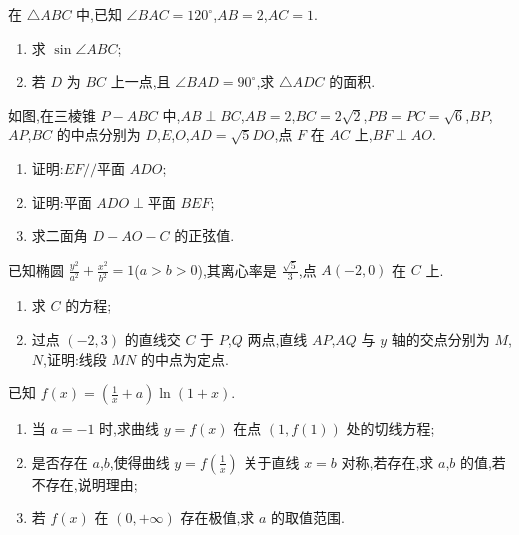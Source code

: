 \begin{problem}
在 \(\triangle ABC\) 中,已知 \(\angle BAC=120^\circ\),\(AB=2\),\(AC=1\).

\begin{enumerate}
\item 求 \(\sin \angle ABC\);
\item 若 \(D\) 为 \(BC\) 上一点,且 \(\angle BAD=90^\circ\),求 \(\triangle ADC\) 的面积.
\end{enumerate}
\end{problem}

\begin{problem}
如图,在三棱锥 \(P-ABC\) 中,\(AB\perp BC\),\(AB=2\),\(BC=2\sqrt2\),\(PB=PC=\sqrt6\),\(BP\),\(AP\),\(BC\) 的中点分别为 \(D\),\(E\),\(O\),\(AD=\sqrt5 DO\),点 \(F\) 在 \(AC\) 上,\(BF\perp AO\).



\begin{enumerate}
\item 证明:\(EF // \text{平面 }ADO\);
\item 证明:\(\text{平面 }ADO\perp\text{平面 }BEF\);
\item 求二面角 \(D-AO-C\) 的正弦值.
\end{enumerate}

\end{problem}

\begin{problem}
已知椭圆
\(\frac{y^2}{a^2}+\frac{x^2}{b^2}=1\)(\(a>b>0\)),其离心率是 \(\frac{\sqrt5}{3}\),点 \(A(-2,0)\) 在 \(C\) 上.

\begin{enumerate}
\item 求 \(C\) 的方程;
\item 过点 \((-2,3)\) 的直线交 \(C\) 于 \(P\),\(Q\) 两点,直线 \(AP\),\(AQ\) 与 \(y\) 轴的交点分别为 \(M\),\(N\),证明:线段 \(MN\) 的中点为定点.
\end{enumerate}
\end{problem}

\begin{problem}
已知
\(f(x)=\left( \frac1x+a \right)\ln(1+x)\).

\begin{enumerate}
\item 当 \(a=-1\) 时,求曲线 \(y=f(x)\) 在点 \((1,f(1))\) 处的切线方程;
\item 是否存在 \(a\),\(b\),使得曲线 \(y=f\left( \frac1x \right)\) 关于直线 \(x=b\) 对称,若存在,求 \(a\),\(b\) 的值,若不存在,说明理由;
\item 若 \(f(x)\) 在 \((0,+\infty)\) 存在极值,求 \(a\) 的取值范围.
\end{enumerate}
\end{problem}

